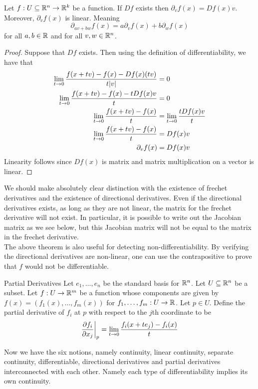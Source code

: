 \documentclass[a4paper]{article}
\begin{document}
\begin{prp}{}{} Let $f:U\subseteq\mathbb{R}^n\to\mathbb{R}^k$ be a function. If $Df$ exists then $\partial_vf(x)=Df(x)v$. Moreover, $\partial_vf(x)$ is linear. Meaning $$\partial_{av+bw}f(x)=a\partial_vf(x)+b\partial_wf(x)$$ for all $a,b\in\mathbb{R}$ and for all $v,w\in\mathbb{R}^n$. 
\begin{proof}
Suppose that $Df$ exists. Then using the definition of differentiability, we have that 
\begin{align*}
\lim_{t\to 0}\frac{f(x+tv)-f(x)-Df(x)(tv)}{t\abs{v}}&=0\\
\lim_{t\to 0}\frac{f(x+tv)-f(x)-tDf(x)v}{t}&=0\\
\lim_{t\to 0}\frac{f(x+tv)-f(x)}{t}&=\lim_{t\to 0}\frac{tDf(x)v}{t}\\
\lim_{t\to 0}\frac{f(x+tv)-f(x)}{t}&=Df(x)v\\
\partial_vf(x)&=Df(x)v
\end{align*}
Linearity follows since $Df(x)$ is matrix and matrix multiplication on a vector is linear. 
\end{proof}
\end{prp}

We should make absolutely clear distinction with the existence of frechet derivatives and the existence of directional derivatives. Even if the directional derivatives exists, as long as they are not linear, the matrix for the frechet derivative will not exist. In particular, it is possible to write out the Jacobian matrix as we see below, but this Jacobian matrix will not be equal to the matrix in the frechet derivative. \\

The above theorem is also useful for detecting non-differentiability. By verifying the directional derivatives are non-linear, one can use the contrapositive to prove that $f$ would not be differentiable. 

\begin{defn}{Partial Derivatives}{} Let $e_1,\dots,e_n$ be the standard basis for $\mathbb{R}^n$. Let $U\subseteq\mathbb{R}^n$ be a subset. Let $f:U\to\mathbb{R}^m$ be a function whose components are given by $f(x)=(f_1(x),\dots,f_m(x))$ for $f_1,\dots,f_m:U\to\mathbb{R}$. Let $p\in U$. Define the partial derivative of $f_i$ at $p$ with respect to the $j$th coordinate to be $$\frac{\partial f_i}{\partial x_j}\bigg{|}_p=\lim_{t\to 0}\frac{f_i(x+te_j)-f_i(x)}{t}$$
\end{defn}

Now we have the six notions, namely continuity, linear continuity, separate continuity, differentiable, directional derivatives and partial derivatives interconnected with each other. Namely each type of differentiability implies its own continuity. 
\end{document}
